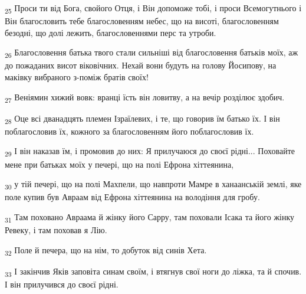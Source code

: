 \begin{tcolorbox}
\textsubscript{25} Проси ти від Бога, свойого Отця, і Він допоможе тобі, і проси Всемогутнього і Він благословить тебе благословенням небес, що на висоті, благословенням безодні, що долі лежить, благословеннями перс та утроби.
\end{tcolorbox}
\begin{tcolorbox}
\textsubscript{26} Благословення батька твого стали сильніші від благословення батьків моїх, аж до пожаданих висот віковічних. Нехай вони будуть на голову Йосипову, на маківку вибраного з-поміж братів своїх!
\end{tcolorbox}
\begin{tcolorbox}
\textsubscript{27} Веніямин хижий вовк: вранці їсть він ловитву, а на вечір розділює здобич.
\end{tcolorbox}
\begin{tcolorbox}
\textsubscript{28} Оце всі дванадцять племен Ізраїлевих, і те, що говорив їм батько їх. І він поблагословив їх, кожного за благословенням його поблагословив їх.
\end{tcolorbox}
\begin{tcolorbox}
\textsubscript{29} І він наказав їм, і промовив до них: Я прилучаюся до своєї рідні... Поховайте мене при батьках моїх у печері, що на полі Ефрона хіттеянина,
\end{tcolorbox}
\begin{tcolorbox}
\textsubscript{30} у тій печері, що на полі Махпели, що навпроти Мамре в ханаанській землі, яке поле купив був Авраам від Ефрона хіттеянина на володіння для гробу.
\end{tcolorbox}
\begin{tcolorbox}
\textsubscript{31} Там поховано Авраама й жінку його Сарру, там поховали Ісака та його жінку Ревеку, і там поховав я Лію.
\end{tcolorbox}
\begin{tcolorbox}
\textsubscript{32} Поле й печера, що на нім, то добуток від синів Хета.
\end{tcolorbox}
\begin{tcolorbox}
\textsubscript{33} І закінчив Яків заповіта синам своїм, і втягнув свої ноги до ліжка, та й спочив. І він прилучився до своєї рідні.
\end{tcolorbox}
